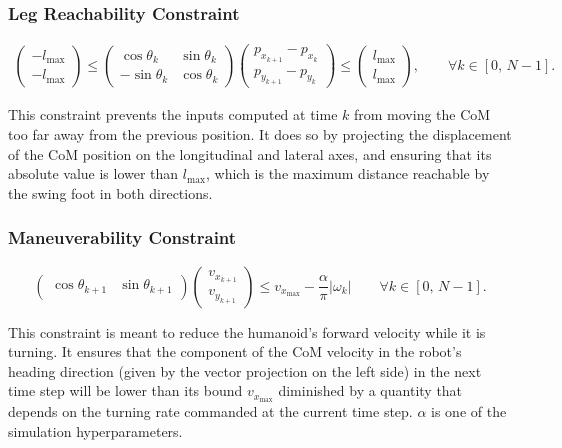 \subsubsection{Leg Reachability Constraint}
\begin{align}
    \begin{pmatrix}
        -l_{\max} \\[1ex]
        -l_{\max}
    \end{pmatrix}
    \le
    \begin{pmatrix}
        \cos\theta_{k} & \sin\theta_{k} \\[1ex]
        -\sin\theta_{k} & \cos\theta_{k}
    \end{pmatrix}
    \begin{pmatrix}
        p_{x_{k+1}} - p_{x_{k}} \\[1ex]
        p_{y_{k+1}} - p_{y_{k}}
    \end{pmatrix}
    \le
    \begin{pmatrix}
        l_{\max} \\[1ex]
        l_{\max}
    \end{pmatrix}
    , \qquad \forall k \in \left[ 0,\, N-1\right].
\end{align}

This constraint prevents the inputs computed at time $k$ from moving the CoM too far away from the previous position.
It does so by projecting the displacement of the CoM position on the longitudinal and lateral axes, and ensuring that its absolute value is lower than $l_{\max}$, which is the maximum distance reachable by the swing foot in both directions.

\subsubsection{Maneuverability Constraint}
\[
\begin{pmatrix}
\cos \theta_{k+1} & \sin \theta_{k+1}
\end{pmatrix}
\begin{pmatrix}
v_{x_{k+1}} \\
v_{y_{k+1}}
\end{pmatrix}
\leq v_{x_{\max}} - \frac{\alpha}{\pi} |\omega_k|
\qquad \forall k \in \left[0,\, N-1 \right].
\]

This constraint is meant to reduce the humanoid's forward velocity while it is turning. It ensures that the component of the CoM velocity in the robot's heading direction (given by the vector projection on the left side) in the next time step will be lower than its bound $v_{x_{\max}}$ diminished by a quantity that depends on the turning rate commanded at the current time step. $\alpha$ is one of the simulation hyperparameters.

